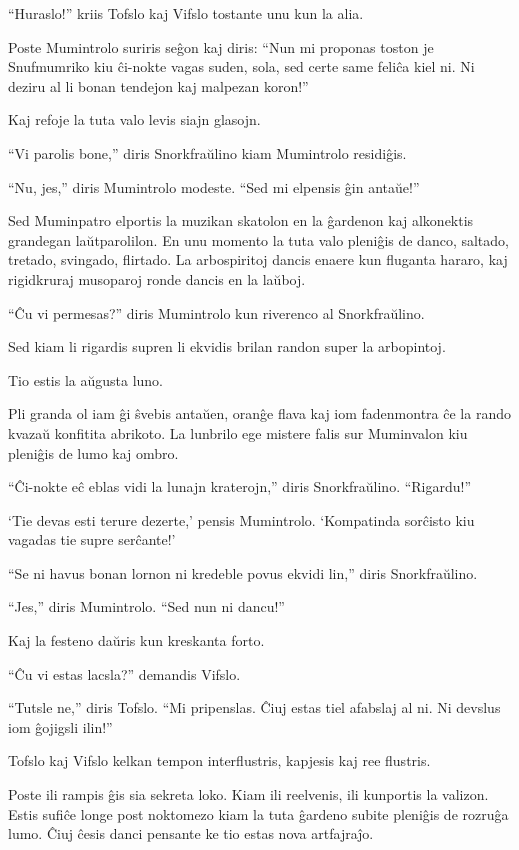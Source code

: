 ``Huraslo!'' kriis Tofslo kaj Vifslo tostante unu kun la alia.

Poste Mumintrolo suriris seĝon kaj diris: ``Nun mi proponas toston je Snufmumriko kiu ĉi-nokte vagas suden, sola, sed certe same feliĉa kiel ni. Ni deziru al li bonan tendejon kaj malpezan koron!''

Kaj refoje la tuta valo levis siajn glasojn.

``Vi parolis bone,'' diris Snorkfraŭlino kiam Mumintrolo residiĝis.

``Nu, jes,'' diris Mumintrolo modeste. ``Sed mi elpensis ĝin antaŭe!''

Sed Muminpatro elportis la muzikan skatolon en la ĝardenon kaj alkonektis grandegan laŭtparolilon. En unu momento la tuta valo pleniĝis de danco, saltado, tretado, svingado, flirtado. La arbospiritoj dancis enaere kun fluganta hararo, kaj rigidkruraj musoparoj ronde dancis en la laŭboj.

``Ĉu vi permesas?'' diris Mumintrolo kun riverenco al Snorkfraŭlino.

Sed kiam li rigardis supren li ekvidis brilan randon super la arbopintoj.

Tio estis la aŭgusta luno.

Pli granda ol iam ĝi ŝvebis antaŭen, oranĝe flava kaj iom fadenmontra ĉe la rando kvazaŭ konfitita abrikoto. La lunbrilo ege mistere falis sur Muminvalon kiu pleniĝis de lumo kaj ombro.

``Ĉi-nokte eĉ eblas vidi la lunajn kraterojn,'' diris Snorkfraŭlino. ``Rigardu!''

`Tie devas esti terure dezerte,' pensis Mumintrolo. `Kompatinda sorĉisto kiu vagadas tie supre serĉante!'

``Se ni havus bonan lornon ni kredeble povus ekvidi lin,'' diris Snorkfraŭlino.

``Jes,'' diris Mumintrolo. ``Sed nun ni dancu!''

Kaj la festeno daŭris kun kreskanta forto.

``Ĉu vi estas lacsla?'' demandis Vifslo.

``Tutsle ne,'' diris Tofslo. ``Mi pripenslas. Ĉiuj estas tiel afabslaj al ni. Ni devslus iom ĝojigsli ilin!''

Tofslo kaj Vifslo kelkan tempon interflustris, kapjesis kaj ree flustris.

Poste ili rampis ĝis sia sekreta loko. Kiam ili reelvenis, ili kunportis la valizon.
\sectionbreak
Estis sufiĉe longe post noktomezo kiam la tuta ĝardeno subite pleniĝis de rozruĝa lumo. Ĉiuj ĉesis danci pensante ke tio estas nova artfajraĵo.

